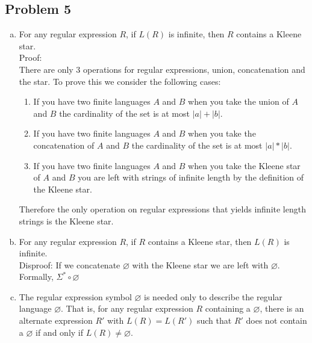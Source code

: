 \documentclass{article}
\begin{document}
\subsection*{Problem 5}
\begin{enumerate}[a)]

    \item For any regular expression $R$, if $L(R)$ is infinite,
    then $R$ contains a Kleene star.\\
    Proof:\\
    There are only 3 operations for regular expressions, union, concatenation and the star.
    To prove this we consider the following cases:
    \begin{enumerate}[1)]
    \item If you have two finite languages $A$ and $B$ when you take the union of $A$ and $B$
    the cardinality of the set is at most $|a| + |b|$.
    \item If you have two finite languages $A$ and $B$ when you take the concatenation
    of $A$ and $B$
    the cardinality of the set is at most $|a| * |b|$.
    \item If you have two finite languages $A$ and $B$ when you take the Kleene star of
    $A$ and $B$ you are left with strings of infinite length by the definition of the
    Kleene star.
    \end{enumerate}

    Therefore the only operation on regular expressions that yields infinite length strings
    is the Kleene star.
    \item For any regular expression $R$, if $R$ contains a Kleene star,
    then $L(R)$ is infinite. \\
    Disproof:
    If we concatenate $\varnothing$ with the Kleene star we are left with $\varnothing$.
    Formally,
    $\Sigma^* \circ \varnothing$

    \item The regular expression symbol $\varnothing$ is needed only to
    describe the regular language $\varnothing$.
    That is, for any regular expression $R$ containing a $\varnothing$,
    there is an alternate expression $R'$ with $L(R) = L(R')$ such that $R'$
    does not contain a $\varnothing$ if and only if $L(R) \neq \varnothing$.


\end{enumerate}
\end{document}
